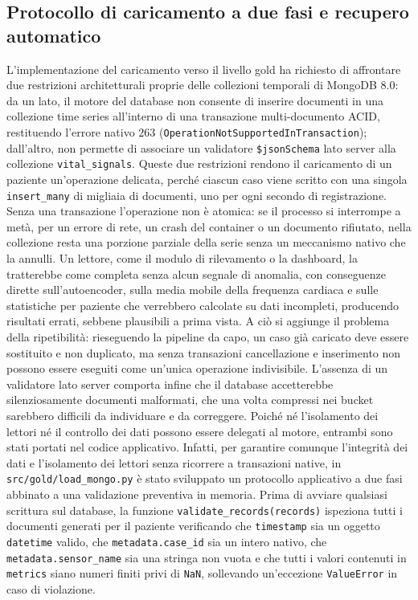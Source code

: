 \subsection{Protocollo di caricamento a due fasi e recupero automatico}
L'implementazione del caricamento verso il livello gold ha richiesto di affrontare due restrizioni architetturali proprie delle collezioni temporali di MongoDB 8.0: da un lato, il motore del database non consente di inserire documenti in una collezione time series all'interno di una transazione multi-documento ACID, restituendo l'errore nativo $263$ (\texttt{OperationNotSupportedInTransaction}); dall'altro, non permette di associare un validatore \texttt{\$jsonSchema} lato server alla collezione \texttt{vital\_signals}.
Queste due restrizioni rendono il caricamento di un paziente un'operazione delicata, perch\'e ciascun caso viene scritto con una singola \texttt{insert\_many} di migliaia di documenti, uno per ogni secondo di registrazione. Senza una transazione l'operazione non \`e atomica: se il processo si interrompe a met\`a, per un errore di rete, un crash del container o un documento rifiutato, nella collezione resta una porzione parziale della serie senza un meccanismo nativo che la annulli. Un lettore, come il modulo di rilevamento o la dashboard, la tratterebbe come completa senza alcun segnale di anomalia, con conseguenze dirette sull'autoencoder, sulla media mobile della frequenza cardiaca e sulle statistiche per paziente che verrebbero calcolate su dati incompleti, producendo risultati errati, sebbene plausibili a prima vista. A ci\`o si aggiunge il problema della ripetibilit\`a: rieseguendo la pipeline da capo, un caso gi\`a caricato deve essere sostituito e non duplicato, ma senza transazioni cancellazione e inserimento non possono essere eseguiti come un'unica operazione indivisibile. L'assenza di un validatore lato server comporta infine che il database accetterebbe silenziosamente documenti malformati, che una volta compressi nei bucket sarebbero difficili da individuare e da correggere. Poich\'e n\'e l'isolamento dei lettori n\'e il controllo dei dati possono essere delegati al motore, entrambi sono stati portati nel codice applicativo. Infatti, per garantire comunque l'integrit\`a dei dati e l'isolamento dei lettori senza ricorrere a transazioni native, in \texttt{src/gold/load\_mongo.py} \`e stato sviluppato un protocollo applicativo a due fasi abbinato a una validazione preventiva in memoria. Prima di avviare qualsiasi scrittura sul database, la funzione \texttt{validate\_records(records)} ispeziona tutti i documenti generati per il paziente verificando che \texttt{timestamp} sia un oggetto \texttt{datetime} valido, che \texttt{metadata.case\_id} sia un intero nativo, che \texttt{metadata.sensor\_name} sia una stringa non vuota e che tutti i valori contenuti in \texttt{metrics} siano numeri finiti privi di \texttt{NaN}, sollevando un'eccezione \texttt{ValueError} in caso di violazione.

